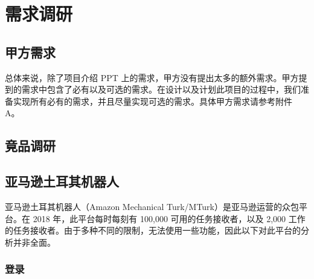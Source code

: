 \section{需求调研}

\subsection{甲方需求}

总体来说，除了项目介绍 PPT 上的需求，甲方没有提出太多的额外需求。甲方提到的需求中包含了必有以及可选的需求。在设计以及计划此项目的过程中，我们准备实现所有必有的需求，并且尽量实现可选的需求。具体甲方需求请参考附件 A。

\subsection{竟品调研}

\subsection{亚马逊土耳其机器人}

亚马逊土耳其机器人（Amazon Mechanical Turk/MTurk）是亚马逊运营的众包平台。在 2018 年，此平台每时每刻有 100,000 可用的任务接收者，以及 2,000 工作的任务接收者。由于多种不同的限制，无法使用一些功能，因此以下对此平台的分析并非全面。

\subsubsection{登录}

